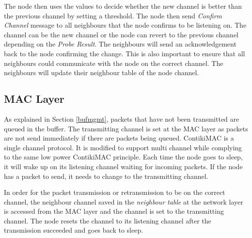 The node then uses the values to decide whether the new channel is better than the previous channel by setting a threshold. The node then send \textit{Confirm Channel} message to all neighbours that the node confirms to be listening on. The channel can be the new channel or the node can revert to the previous channel depending on the \textit{Probe Result}. The neighbours will send an acknowledgement back to the node confirming the change. This is also important to ensure that all neighbours could communicate with the node on the correct channel. The neighbours will update their neighbour table of the node channel. 

\subsection{MAC Layer}
As explained in Section \ref{bufmgmt}, packets that have not been transmitted are queued in the buffer. The transmitting channel is set at the MAC layer as packets are not send immediately if there are packets being queued. ContikiMAC is a single channel protocol. It is modified to support multi channel while complying to the same low power ContikiMAC principle. Each time the node goes to sleep, it will wake up on its listening channel waiting for incoming packets. If the node has a packet to send, it needs to change to the transmitting channel.

In order for the packet transmission or retransmission to be on the correct channel, the neighbour channel saved in the \textit{neighbour table} at the network layer is accessed from the MAC layer and the channel is set to the transmitting channel. The node resets the channel to its listening channel after the transmission succeeded and goes back to sleep.


